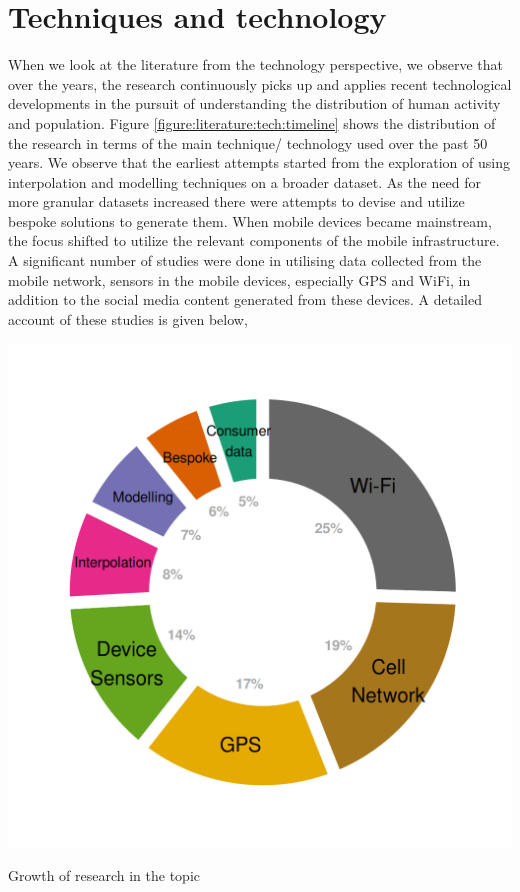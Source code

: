 \section{Techniques and technology}

When we look at the literature from the technology perspective, we observe that over the years, the research continuously picks up and applies recent technological developments in the pursuit of understanding the distribution of human activity and population.
Figure \ref{figure:literature:tech:timeline} shows the distribution of the research in terms of the main technique/ technology used over the past 50 years.
We observe that the earliest attempts started from the exploration of using interpolation and modelling techniques on a broader dataset.
As the need for more granular datasets increased there were attempts to devise and utilize bespoke solutions to generate them.
When mobile devices became mainstream, the focus shifted to utilize the relevant components of the mobile infrastructure.
A significant number of studies were done in utilising data collected from the mobile network, sensors in the mobile devices, especially GPS and WiFi, in addition to the social media content generated from these devices.
A detailed account of these studies is given below,

\begin{marginfigure}[-7.5cm]
  \forcerectofloat
  \includegraphics[trim={1.1cm 1cm 1cm 1cm},clip]{images/literature-technology.png}
  \caption{Growth of research in the topic}
  \label{figure:literature:timeline}
  \forcerectofloat
\end{marginfigure}

